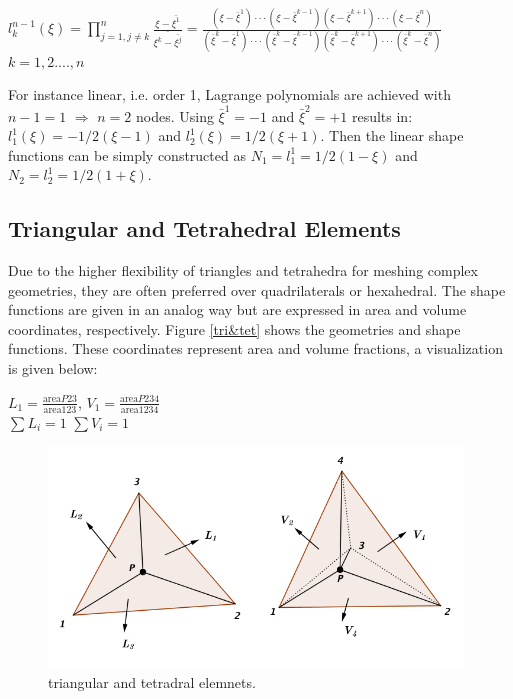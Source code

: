 \documentclass{article}
\begin{document}
\begin{center}
	$l_k^{n-1} \left( \xi \right) = \prod_{j = 1, j \neq k}^{n} \frac{\xi - \bar{\xi^1}}{\bar{\xi^k - \bar{\xi^j}}} = \frac{\left(\xi - \bar{\xi}^1\right)\cdot\cdot\cdot \left( \xi - \bar{\xi}^{k-1}\right) \left(\xi - \bar{\xi}^{k+1}\right)\cdot\cdot\cdot \left(\xi -\bar{\xi}^n\right)}{\left(\bar{\xi}^k - \bar{\xi}^1\right)\cdot\cdot\cdot \left( \bar{\xi}^k - \bar{\xi}^{k-1}\right) \left(\bar{\xi}^k - \bar{\xi}^{k+1}\right)\cdot\cdot\cdot \left(\bar{\xi}^k -\bar{\xi}^n\right)}$ \\[4mm] \quad $k = 1,2....,n$
\end{center}
 For instance linear, i.e. order 1, Lagrange polynomials are achieved with $n-1=1$ $\Rightarrow$ $n=2$ nodes. Using $\bar{\xi}^1 = -1$ and $\bar{\xi}^2 = +1$ results in: $l_1^1\left(\xi\right) = -1/2\left(\xi - 1\right)$ and $l_2^1\left(\xi\right) = 1/2\left(\xi + 1\right)$.
 Then the linear shape functions can be simply constructed as $N_1 =l_1^1 = 1/2\left(1-\xi\right)$ and $N_2 = l_2^1 = 1/2\left(1+\xi\right)$.
 
 \subsection{Triangular and Tetrahedral Elements}
 Due to the higher flexibility of triangles and tetrahedra for meshing complex geometries, they are often preferred over quadrilaterals or hexahedral. The shape functions are given in an analog way but are expressed in area and volume coordinates, respectively. Figure \ref{tri&tet} shows the geometries and shape functions. These coordinates represent area and volume fractions, a visualization is given below:
 \begin{center}
 	$L_1 = \frac{\text{area}P23}{\text{area}123}$, \quad $V_1 = \frac{\text{area}P234}{\text{area}1234}$ \\[4mm]
 	$\sum L_i = 1$ \quad\quad $\sum V_i = 1$
 \end{center}
 
 \begin{figure}
 	\begin{center}
 		\includegraphics[width=11cm,clip]{Tri&Tet.pdf}			
 		\caption{triangular and tetradral elemnets.} \label{fig: tri&tet}
 	\end{center}
 \end{figure}
 
\end{document}
